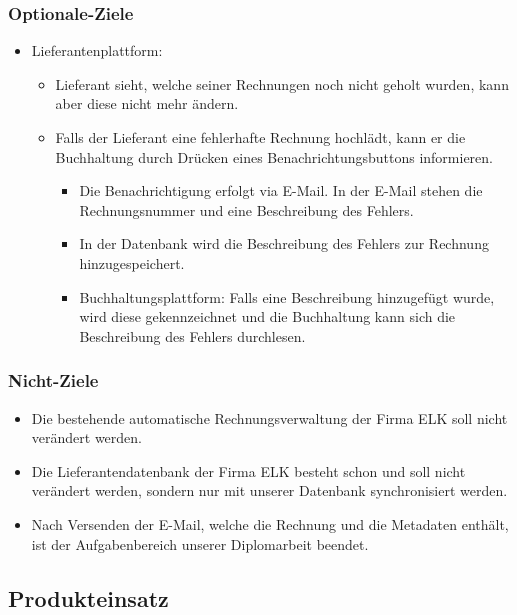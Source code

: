 \subsubsection{Optionale-Ziele}
\begin{itemize}
\item Lieferantenplattform: 

\begin{itemize}
\item Lieferant sieht, welche seiner Rechnungen noch nicht geholt wurden,
kann aber diese nicht mehr ändern. 
\item Falls der Lieferant eine fehlerhafte Rechnung hochlädt, kann er die
Buchhaltung durch Drücken eines Benachrichtungsbuttons informieren. 

\begin{itemize}
\item Die Benachrichtigung erfolgt via E-Mail. In der E-Mail stehen die
Rechnungsnummer und eine Beschreibung des Fehlers. 
\item In der Datenbank wird die Beschreibung des Fehlers zur Rechnung hinzugespeichert. 
\item Buchhaltungsplattform: Falls eine Beschreibung hinzugefügt wurde,
wird diese gekennzeichnet und die Buchhaltung kann sich die Beschreibung
des Fehlers durchlesen.
\end{itemize}
\end{itemize}
\end{itemize}

\subsubsection{Nicht-Ziele}
\begin{itemize}
\item Die bestehende automatische Rechnungsverwaltung der Firma ELK soll
nicht verändert werden. 
\item Die Lieferantendatenbank der Firma ELK besteht schon und soll nicht
verändert werden, sondern nur mit unserer Datenbank synchronisiert
werden. 
\item Nach Versenden der E-Mail, welche die Rechnung und die Metadaten enthält,
ist der Aufgabenbereich unserer Diplomarbeit beendet. 
\end{itemize}

\subsection{Produkteinsatz}


